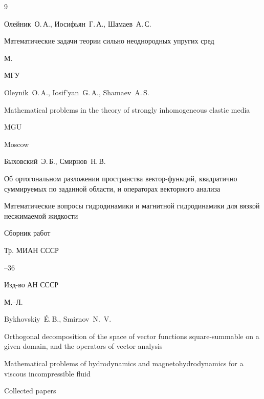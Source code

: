 \begin{thebibliography}{9}




\by Олейник~О.\,А., Иосифьян~Г.\,А., Шамаев~А.\,С.

\book Математические задачи теории сильно неоднородных упругих сред

\publaddr М.

\publ МГУ



\misctransl 

\by Oleynik~O.\,A., Iosif'yan~G.\,A., Shamaev~A.\,S.

\book Mathematical problems in the theory of strongly inhomogeneous elastic media

\publ MGU

\publaddr Moscow








\by Быховский~Э.\,Б., Смирнов~Н.\,В.

\paper Об ортогональном разложении пространства вектор-функций, квадратично суммируемых по заданной области, и операторах векторного анализа

\inbook Математические вопросы гидродинамики и магнитной гидродинамики для вязкой несжимаемой жидкости

\bookinfo Сборник работ

\serial Тр. МИАН СССР



--36

\publ Изд-во АН СССР

\publaddr М.--Л.

\misctransl

\by Bykhovskiy~\'E.\,B., Smirnov~N.~V.

\paper Orthogonal decomposition of the space of vector functions square-summable on a given domain, and the operators of vector analysis

\inbook Mathematical problems of hydrodynamics and magnetohydrodynamics for a viscous incompressible fluid

\bookinfo Collected papers


\end{thebibliography}
